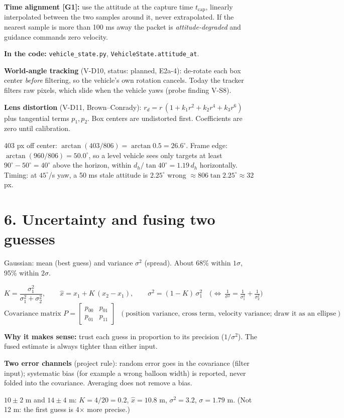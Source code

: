 \documentclass[10pt]{article}
\newcommand{\code}[1]{\textcolor{code}{\texttt{#1}}}
\newcommand{\where}[1]{\par\textbf{\textcolor{code}{In the code:}} #1}
\newcommand{\why}[1]{\par\textbf{\textcolor{idea}{Why it makes sense:}} #1}
\begin{document}
\textbf{Time alignment [G1]:} use the attitude at the capture time $t_\text{cap}$,
linearly interpolated between the two samples around it, never extrapolated. If the
nearest sample is more than 100 ms away the packet is \emph{attitude-degraded} and
guidance commands zero velocity.
\where{\code{vehicle\_state.py}, \code{VehicleState.attitude\_at}.}

\textbf{World-angle tracking} (V-D10, status: planned, E2a-4): de-rotate each box
center \emph{before} filtering, so the vehicle's own rotation cancels. Today the tracker
filters raw pixels, which slide when the vehicle yaws (probe finding V-S8).

\textbf{Lens distortion} (V-D11, Brown--Conrady): $r_d = r\,(1 + k_1 r^2 + k_2 r^4 + k_3
r^6)$ plus tangential terms $p_1, p_2$. Box centers are undistorted first. Coefficients
are zero until calibration.
\begin{exbox}
403 px off center: $\arctan(403/806) = \arctan 0.5 = 26.6^\circ$. Frame edge:
$\arctan(960/806) = 50.0^\circ$, so a level vehicle sees only targets at least
$90^\circ - 50^\circ = 40^\circ$ above the horizon, within $d_h/\tan 40^\circ = 1.19\,d_h$
horizontally.
Timing: at $45^\circ$/s yaw, a 50 ms stale attitude is $2.25^\circ$ wrong $\approx
806\tan 2.25^\circ \approx 32$ px.
\end{exbox}

\section*{6. Uncertainty and fusing two guesses}
Gaussian: mean (best guess) and variance $\sigma^2$ (spread). About 68\% within
$1\sigma$, 95\% within $2\sigma$.
\begin{eqbox}
\[
K = \frac{\sigma_1^2}{\sigma_1^2 + \sigma_2^2},\qquad
\hat x = x_1 + K\,(x_2 - x_1),\qquad
\sigma^2 = (1-K)\,\sigma_1^2
\quad\Big(\Leftrightarrow\ \tfrac{1}{\sigma^2} = \tfrac{1}{\sigma_1^2} + \tfrac{1}{\sigma_2^2}\Big)
\]
\[
\text{Covariance matrix } P = \begin{bmatrix} p_{00} & p_{01}\\ p_{01} & p_{11}\end{bmatrix}
\;\;(\text{position variance, cross term, velocity variance; draw it as an ellipse})
\]
\end{eqbox}
\why{trust each guess in proportion to its precision ($1/\sigma^2$). The fused estimate
is always tighter than either input.}

\textbf{Two error channels} (project rule): random error goes in the covariance (filter
input); systematic bias (for example a wrong balloon width) is reported, never folded into
the covariance. Averaging does not remove a bias.
\begin{exbox}
$10 \pm 2$ m and $14 \pm 4$ m: $K = 4/20 = 0.2$, $\hat x = 10.8$ m, $\sigma^2 = 3.2$,
$\sigma = 1.79$ m. (Not 12 m: the first guess is 4$\times$ more precise.)
\end{exbox}
\end{document}
